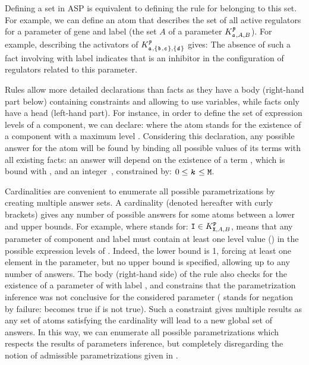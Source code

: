 Defining a set in ASP is equivalent to defining the rule for belonging to this set. For example, we can define an atom  that describes the set of all active regulators for a parameter of gene  and label  (\ie the set $A$ of a parameter $K^{\texttt{\textit{p}}}_{\texttt{\textit{a}},A,B}$). For example, describing the activators of $K^{\texttt{\textit{p}}}_{\texttt{\textit{a}},\{\texttt{\textit{b}},\texttt{\textit{c}}\},\{\texttt{\textit{d}}\}}$ gives:
The absence of such a fact involving  with label  indicates that  is an inhibitor in the configuration of regulators related to this parameter.

Rules allow more detailed declarations than facts as they have a body (right-hand part below) containing constraints and allowing to use variables, while facts only have a head (left-hand part).
For instance, in order to define the set of expression levels of a component, we can declare:
where the  atom stands for the existence of a component  with a maximum level .
Considering this declaration, any possible answer for the atom  will be found by binding all possible values of its terms with all existing  facts: an answer  will depend on the existence of a term , which is bound with , and an integer~, constrained by: $0 \leq \texttt{\textit{k}} \leq \texttt{M}$.

Cardinalities are convenient to enumerate all possible parametrizations by creating multiple answer sets.
A cardinality (denoted hereafter with curly brackets) gives any number of possible answers for some atoms between a lower and upper bounds.
For example,
where  stands for: $\texttt{I} \in K^{\texttt{P}}_{\texttt{X},A,B}$,
means that any parameter of component  and label  must contain at least one level value () in the possible expression levels of .
Indeed, the lower bound is 1, forcing at least one element in the parameter, but no upper bound is specified, allowing up to any number of answers.
The body (right-hand side) of the rule also checks for the existence of a parameter of  with label , and constrains that the parametrization inference was not conclusive for the considered parameter ( stands for negation by failure:  becomes true if  is not true).
Such a constraint gives multiple results as any set of  atoms satisfying the cardinality will lead to a new global set of answers.
In this way, we can enumerate all possible parametrizations which respects the results of parameters
inference, but completely disregarding the notion of admissible parametrizations given in
.

